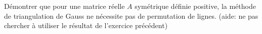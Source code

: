 
\begin{exercice}\label{exoSerieCinq0005}

	Démontrer que pour une matrice réelle $A$ symétrique définie positive, la méthode de triangulation de Gauss ne nécessite pas de permutation de lignes. (aide: ne pas chercher à utiliser le résultat de l'exercice précédent)

\end{exercice}
